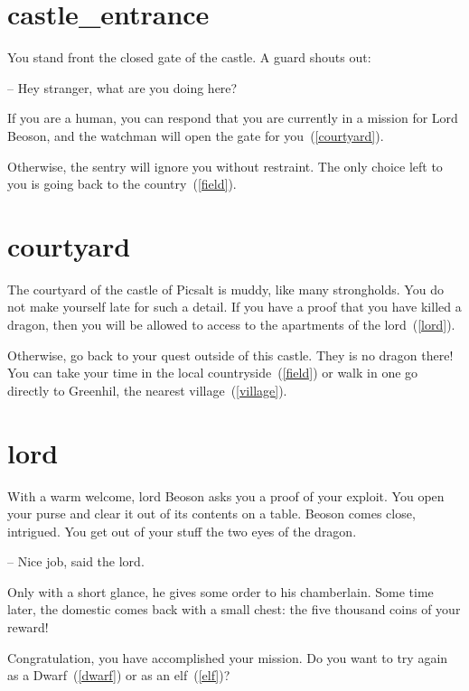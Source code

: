 \section{castle_entrance}

You stand front the closed gate of the castle. A guard shouts out:

-- Hey stranger, what are you doing here?

If you are a human, you can respond that you are currently in a mission for Lord
Beoson, and the watchman will open the gate for you~(\ref{courtyard}).

Otherwise, the sentry will ignore you without restraint. The only choice
left to you is going back to the country~(\ref{field}).

\section{courtyard}

The courtyard of the castle of Picsalt is muddy, like many strongholds. You do
not make yourself late for such a detail. If you have a proof that you have
killed a dragon, then you will be allowed to access to the apartments of the
lord~(\ref{lord}).

Otherwise, go back to your quest outside of this castle. They is no dragon
there! You can take your time in the local countryside~(\ref{field}) or walk in
one go directly to Greenhil, the nearest village~(\ref{village}).

\section{lord}

With a warm welcome, lord Beoson asks you a proof of your exploit.  You open
your purse and clear it out of its contents on a table. Beoson comes close,
intrigued. You get out of your stuff the two eyes of the dragon.

-- Nice job, said the lord.

Only with a short glance, he gives some order to his chamberlain. Some time
later, the domestic comes back with a small chest: the five thousand coins of
your reward!

\medbreak

Congratulation, you have accomplished your mission. Do you want to try again as a
Dwarf~(\ref{dwarf}) or as an elf~(\ref{elf})?
